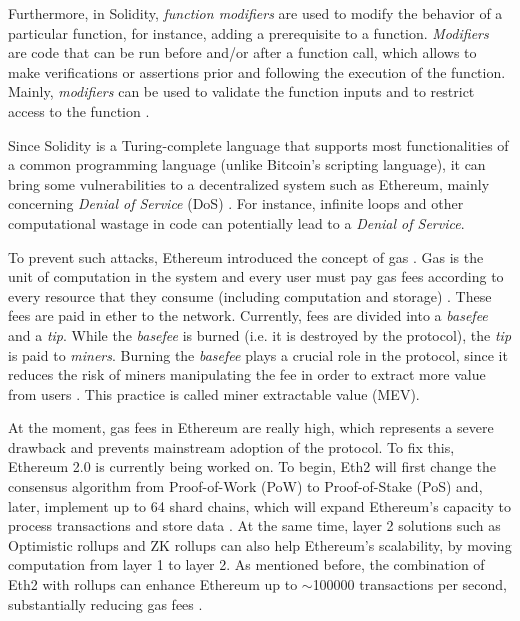 \documentclass[runningheads]{llncs}
\begin{document}
Furthermore, in Solidity, \textit{function modifiers} are used to modify the behavior of a particular function, for instance, adding a prerequisite to a function. \textit{Modifiers} are code that can be run before and/or after a function call, which allows to make verifications or assertions prior and following the execution of the function. Mainly, \textit{modifiers} can be used to validate the function inputs and to restrict access to the function \cite{solidity_example}.

Since Solidity is a Turing-complete language that supports most functionalities of a common programming language (unlike Bitcoin's scripting language), it can bring some vulnerabilities to a decentralized system such as Ethereum, mainly concerning \textit{Denial of Service} (DoS) \cite{buterin_2014}. For instance, infinite loops and other computational wastage in code can potentially lead to a \textit{Denial of Service}.

To prevent such attacks, Ethereum introduced the concept of gas \cite{solidity_example}. Gas is the unit of computation in the system and every user must pay gas fees according to every resource that they consume (including computation and storage) \cite{buterin_2014}. These fees are paid in ether to the network. Currently, fees are divided into a \textit{basefee} and a \textit{tip}. While the \textit{basefee} is burned (i.e. it is destroyed by the protocol), the \textit{tip} is paid to \textit{miners}. Burning the \textit{basefee} plays a crucial role in the protocol, since it reduces the risk of miners manipulating the fee in order to extract more value from users \cite{eip_1559}. This practice is called miner extractable value (MEV).

At the moment, gas fees in Ethereum are really high, which represents a severe drawback and prevents mainstream adoption of the protocol. To fix this, Ethereum 2.0 is currently being worked on. To begin, Eth2 will first change the consensus algorithm from Proof-of-Work (PoW) to Proof-of-Stake (PoS) and, later, implement up to 64 shard chains, which will expand Ethereum's capacity to process transactions and store data \cite{eth2}. At the same time, layer 2 solutions such as Optimistic rollups and ZK rollups can also help Ethereum's scalability, by moving computation from layer 1 to layer 2. As mentioned before, the combination of Eth2 with rollups can enhance Ethereum up to \(\sim\)100000 transactions per second, substantially reducing gas fees \cite{buterin_2020}.
\end{document}
